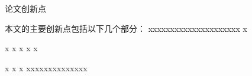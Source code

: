 
\newpage\vspace*{20pt}\thispagestyle{empty}
\begin{center}{\heiti 论文创新点}\end{center}
\par\vspace*{30pt}
\baselineskip=20pt



本文的主要创新点包括以下几个部分：
xxxxxxxxxxxxxxxxxxxxx
x

x
x
x
x
x

x
x
x
xxxxxxxxxxxxxx























  \iflib
  \let\cleardoublepage\clearpage
  \else
  \newpage
  \thispagestyle{empty}
  \cleardoublepage
  \fi



